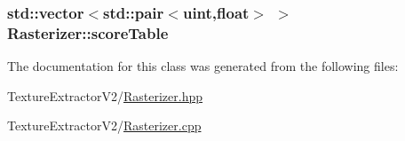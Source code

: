\subsubsection[{score\+Table}]{\setlength{\rightskip}{0pt plus 5cm}std\+::vector$<$std\+::pair$<$uint,float$>$ $>$ Rasterizer\+::score\+Table}\label{class_rasterizer_a8c5ae8edeb03c773a841eef9207bef4d}


The documentation for this class was generated from the following files\+:\begin{DoxyCompactItemize}
\item 
Texture\+Extractor\+V2/\hyperlink{_rasterizer_8hpp}{Rasterizer.\+hpp}\item 
Texture\+Extractor\+V2/\hyperlink{_rasterizer_8cpp}{Rasterizer.\+cpp}\end{DoxyCompactItemize}
